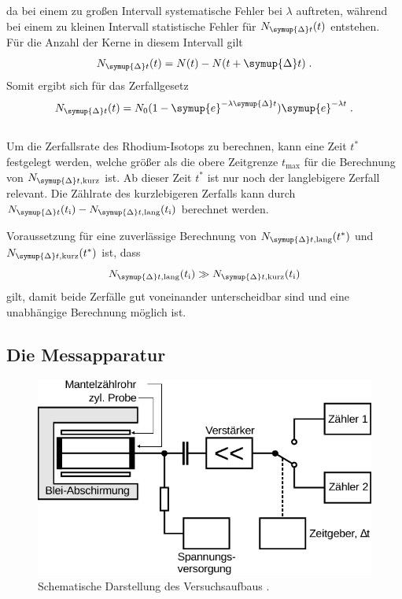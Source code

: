    da bei einem zu großen Intervall systematische Fehler bei $\lambda$ auftreten,
    während bei einem zu kleinen Intervall statistische Fehler für $N_{\symup{\Delta}t}(t)$ entstehen.\\
    Für die Anzahl der Kerne in diesem Intervall gilt
    \begin{equation*}
        N_{\symup{\Delta}t}(t) = N(t) - N(t + \symup{\Delta} t) \; .
    \end{equation*}
    Somit ergibt sich für das Zerfallgesetz
    \begin{equation*}
        N_{\symup{\Delta}t}(t) = N_0 (1 - \symup{e}^{-\lambda \symup{\Delta}t}) \symup{e}^{-\lambda t} \; .
    \end{equation*}
    \\
    Um die Zerfallsrate des Rhodium-Isotops zu berechnen,
    kann eine Zeit $t^*$ festgelegt werden,
    welche größer als die obere Zeitgrenze $t_\text{max}$ für die Berechnung von $N_{\symup{\Delta}t, \text{kurz}}$ ist.
    Ab dieser Zeit $t^*$ ist nur noch der langlebigere Zerfall relevant.
    Die Zählrate des kurzlebigeren Zerfalls kann durch $N_{\symup{\Delta}t} (t_\text{i}) - N_{\symup{\Delta}t, \text{lang}} (t_\text{i})$ berechnet werden.

    Voraussetzung für eine zuverlässige Berechnung von
    $N_{\symup{\Delta}t, \text{lang}} (t^*)$
    und $N_{\symup{\Delta}t, \text{kurz}} (t^*)$
    ist, dass
    \begin{equation*}
        N_{\symup{\Delta}t, \text{lang}} (t_\text{i}) \gg N_{\symup{\Delta}t, \text{kurz}} (t_\text{i})
    \end{equation*}
    gilt,
    damit beide Zerfälle gut voneinander unterscheidbar sind
    und eine unabhängige Berechnung möglich ist.

\subsection{Die Messapparatur}

    \begin{figure}[H]
      \centering
      \includegraphics[width=\textwidth]{content/img/Abb_3.pdf}
      \caption{Schematische Darstellung des Versuchsaufbaus \cite{versuchsanleitung}.}
      \label{fig:gmz}
    \end{figure}

